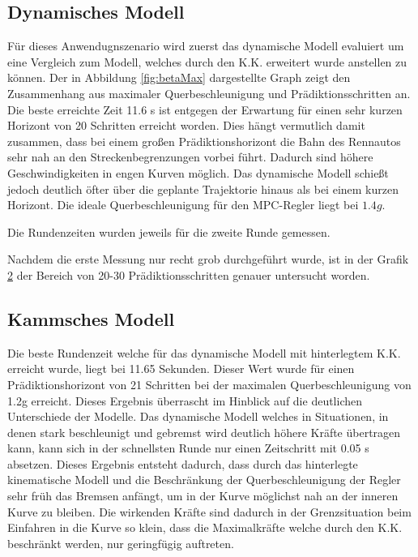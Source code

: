 \documentclass{like}
\begin{document}
\subsection{Dynamisches Modell}
Für dieses Anwendugnszenario wird zuerst das dynamische Modell evaluiert um eine Vergleich zum Modell, welches durch den \ac{K.K.} erweitert wurde anstellen zu können.
Der in Abbildung \ref{fig:betaMax} dargestellte Graph zeigt den Zusammenhang aus maximaler Querbeschleunigung und Prädiktionsschritten an. Die beste erreichte Zeit 11.6 s ist entgegen der Erwartung für einen sehr kurzen Horizont von 20 Schritten erreicht worden. Dies hängt vermutlich damit zusammen, dass bei einem großen Prädiktionshorizont die Bahn des Rennautos sehr nah an den Streckenbegrenzungen vorbei führt. Dadurch sind höhere Geschwindigkeiten in engen Kurven möglich. Das dynamische Modell schießt jedoch deutlich öfter über die geplante Trajektorie hinaus als bei einem kurzen Horizont. Die ideale Querbeschleunigung für den \ac{MPC}-Regler liegt bei $1.4 g$.  
  
\begin{figure}
	\centering
	 
	\caption{}
	\label{fig:betaMaxN}
\end{figure}

Die Rundenzeiten wurden jeweils für die zweite Runde gemessen.

Nachdem die erste Messung nur recht grob durchgeführt wurde, ist in der Grafik \ref{fig:betaMaxFine} der Bereich von 20-30 Prädiktionsschritten genauer untersucht worden.

\begin{figure}
	\centering
	 
	\caption{}
	\label{fig:betaMaxFine}
\end{figure}

\subsection{Kammsches Modell}

Die beste Rundenzeit welche für das dynamische Modell mit hinterlegtem \ac{K.K.} erreicht wurde, liegt bei 11.65 Sekunden. Dieser Wert wurde für einen Prädiktionshorizont von 21 Schritten bei der maximalen Querbeschleunigung von 1.2g erreicht. Dieses Ergebnis überrascht im Hinblick auf die deutlichen Unterschiede der Modelle. Das dynamische Modell welches in Situationen, in denen stark beschleunigt und gebremst wird deutlich höhere Kräfte übertragen kann, kann sich in der schnellsten Runde nur einen Zeitschritt mit 0.05 s absetzen. Dieses Ergebnis entsteht dadurch, dass durch das hinterlegte kinematische Modell und die Beschränkung der Querbeschleunigung der Regler sehr früh das Bremsen anfängt, um in der Kurve möglichst nah an der inneren Kurve zu bleiben. Die wirkenden Kräfte sind dadurch in der Grenzsituation beim Einfahren in die Kurve so klein, dass die Maximalkräfte welche durch den \ac{K.K.} beschränkt werden, nur geringfügig auftreten.
\begin{figure}
	\centering
	 
	\caption{}
	\label{fig:betaMaxFineKam}
\end{figure}
\end{document}
